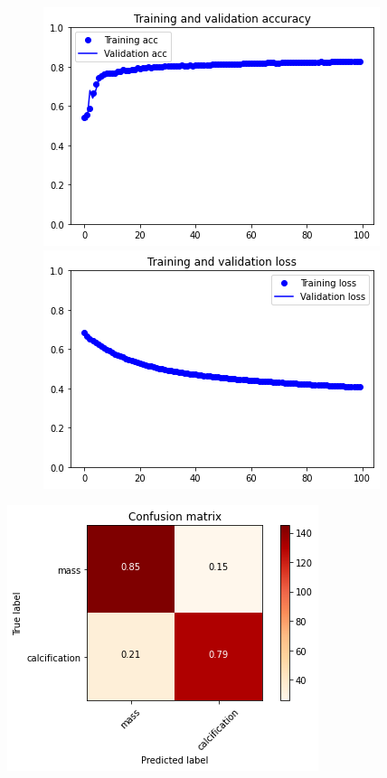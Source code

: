\documentclass{article}
\begin{document}
\begin{figure}[h]
    \centering
    \begin{minipage}{0.45\textwidth}
        \centering
        \includegraphics[scale=0.46]{./img/preTrainValVGG19_fe.png}
    \end{minipage}\hfill
    \begin{minipage}{0.45\textwidth}
        \centering
        \includegraphics[scale=0.46]{./img/preTrainLossVGG19_fe.png}
    \end{minipage}
\end{figure}

\begin{center}
\begin{minipage}{0.45\textwidth}
        \includegraphics[scale=0.6]{./img/cmPreTrainVGG19_fe.png}
    \end{minipage}
\end{center}
\end{document}
